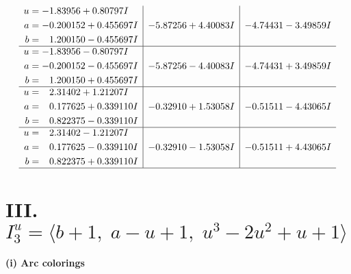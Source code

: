 \documentclass[1p]{elsarticle_modified}
\theoremstyle{definition}
\begin{document}
$$\begin{array}{c|c|c}
\begin{aligned}
u &= -1.83956 + 0.80797 I \\
a &= -0.200152 + 0.455697 I \\
b &= \phantom{-}1.200150 - 0.455697 I\end{aligned}
 & -5.87256 + 4.40083 I & -4.74431 - 3.49859 I \\ \hline\begin{aligned}
u &= -1.83956 - 0.80797 I \\
a &= -0.200152 - 0.455697 I \\
b &= \phantom{-}1.200150 + 0.455697 I\end{aligned}
 & -5.87256 - 4.40083 I & -4.74431 + 3.49859 I \\ \hline\begin{aligned}
u &= \phantom{-}2.31402 + 1.21207 I \\
a &= \phantom{-}0.177625 + 0.339110 I \\
b &= \phantom{-}0.822375 - 0.339110 I\end{aligned}
 & -0.32910 + 1.53058 I & -0.51511 - 4.43065 I \\ \hline\begin{aligned}
u &= \phantom{-}2.31402 - 1.21207 I \\
a &= \phantom{-}0.177625 - 0.339110 I \\
b &= \phantom{-}0.822375 + 0.339110 I\end{aligned}
 & -0.32910 - 1.53058 I & -0.51511 + 4.43065 I\\
 \hline 
 \end{array}$$\newpage\newpage\renewcommand{\arraystretch}{1}
\centering \section*{III. $I^u_{3}= \langle b+1,\;a- u+1,\;u^3-2 u^2+u+1 \rangle$}
\flushleft \textbf{(i) Arc colorings}\\
\end{document}
